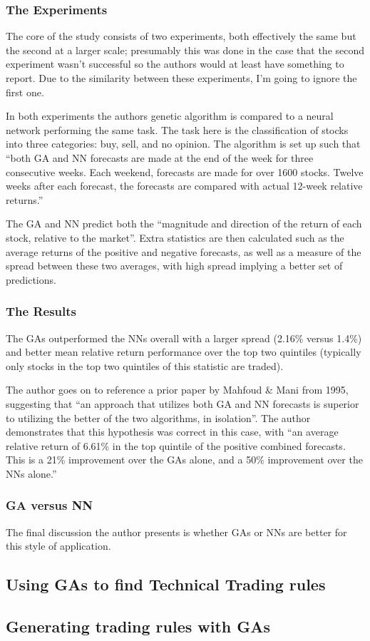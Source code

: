\subsubsection{The Experiments}

The core of the study consists of two experiments, both effectively the same but the second at a larger scale; presumably this was done in the case that the second experiment wasn't successful so the authors would at least have something to report. Due to the similarity between these experiments, I'm going to ignore the first one. \newline

In both experiments the authors genetic algorithm is compared to a neural network performing the same task. The task here is the classification of stocks into three categories: buy, sell, and no opinion. The algorithm is set up such that ``both GA and NN forecasts are made at the end of the week for three consecutive weeks. Each weekend, forecasts are made for over 1600 stocks. Twelve weeks after each forecast, the forecasts are compared with actual 12-week relative returns.'' \newline

The GA and NN predict both the ``magnitude and direction of the return of each stock, relative to the market''. Extra statistics are then calculated such as the average returns of the positive and negative forecasts, as well as a measure of the spread between these two averages, with high spread implying a better set of predictions.

\subsubsection{The Results}

The GAs outperformed the NNs overall with a larger spread (2.16\% versus 1.4\%) and better mean relative return performance over the top two quintiles (typically only stocks in the top two quintiles of this statistic are traded). \newline

The author goes on to reference a prior paper by Mahfoud \& Mani from 1995, suggesting that ``an approach that utilizes both GA and NN forecasts is superior to utilizing the better of the two algorithms, in isolation''. The author demonstrates that this hypothesis was correct in this case, with ``an average relative return of 6.61\% in the top quintile of the positive combined forecasts. This is a 21\% improvement over the GAs alone, and a 50\% improvement over the NNs alone.''

\subsubsection{GA versus NN}

The final discussion the author presents is whether GAs or NNs are better for this style of application. 

\subsection{Using GAs to find Technical Trading rules \cite{allenKarjalainen}}

\subsection{Generating trading rules with GAs \cite{potvinaSorianoaVallee}}